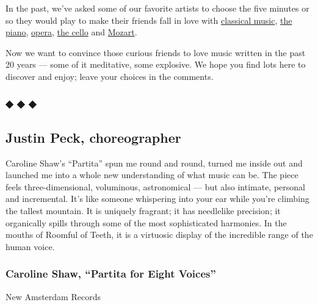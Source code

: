 In the past, we've asked some of our favorite artists to choose the five
minutes or so they would play to make their friends fall in love with
\href{https://www.nytimes3xbfgragh.onion/2018/09/06/arts/music/5-minutes-that-will-make-you-love-classical-music.html}{classical
music},
\href{https://www.nytimes3xbfgragh.onion/2019/04/19/arts/music/classical-music-piano.html}{the
piano},
\href{https://www.nytimes3xbfgragh.onion/2020/04/28/arts/music/classical-music-opera.html}{opera},
\href{https://www.nytimes3xbfgragh.onion/2020/06/03/arts/music/five-minutes-classical-music-cello.html}{the
cello} and
\href{https://www.nytimes3xbfgragh.onion/2020/07/01/arts/music/classical-music-mozart.html}{Mozart}.

Now we want to convince those curious friends to love music written in
the past 20 years --- some of it meditative, some explosive. We hope you
find lots here to discover and enjoy; leave your choices in the
comments.

\hypertarget{--}{%
\subsubsection{◆ ◆ ◆}\label{--}}

\hypertarget{justin-peck-choreographer}{%
\subsection{Justin Peck,
choreographer}\label{justin-peck-choreographer}}

Caroline Shaw's ``Partita'' spun me round and round, turned me inside
out and launched me into a whole new understanding of what music can be.
The piece feels three-dimensional, voluminous, astronomical --- but also
intimate, personal and incremental. It's like someone whispering into
your ear while you're climbing the tallest mountain. It is uniquely
fragrant; it has needlelike precision; it organically spills through
some of the most sophisticated harmonies. In the mouths of Roomful of
Teeth, it is a virtuosic display of the incredible range of the human
voice.

\hypertarget{caroline-shaw-partita-for-eight-voices}{%
\subsubsection{Caroline Shaw, ``Partita for Eight
Voices''}\label{caroline-shaw-partita-for-eight-voices}}

New Amsterdam Records

